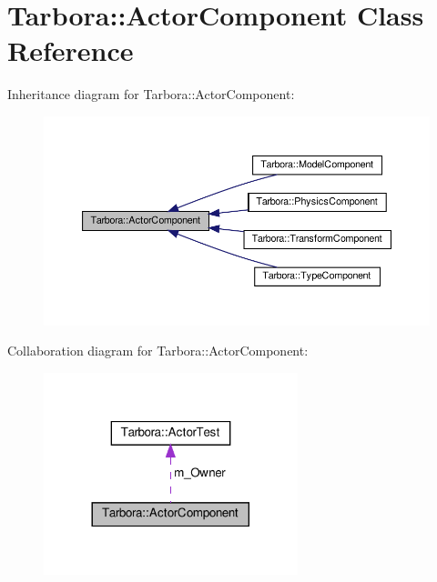 \hypertarget{classTarbora_1_1ActorComponent}{}\section{Tarbora\+:\+:Actor\+Component Class Reference}
\label{classTarbora_1_1ActorComponent}


Inheritance diagram for Tarbora\+:\+:Actor\+Component\+:\nopagebreak
\begin{figure}[H]
\begin{center}
\leavevmode
\includegraphics[width=350pt]{classTarbora_1_1ActorComponent__inherit__graph}
\end{center}
\end{figure}


Collaboration diagram for Tarbora\+:\+:Actor\+Component\+:\nopagebreak
\begin{figure}[H]
\begin{center}
\leavevmode
\includegraphics[width=209pt]{classTarbora_1_1ActorComponent__coll__graph}
\end{center}
\end{figure}
